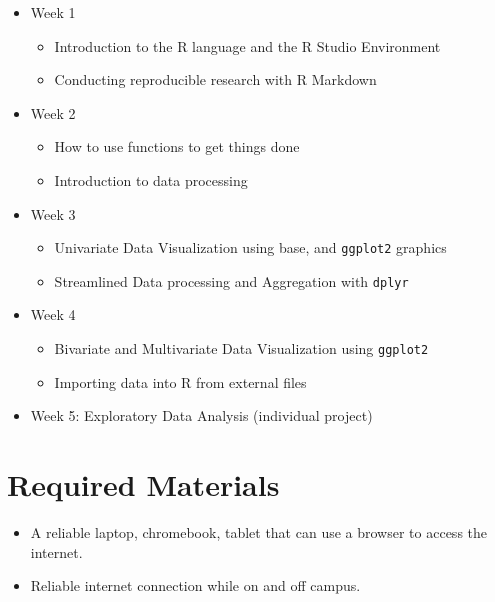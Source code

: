 \documentclass[
  11pt,
]{article}
\providecommand{\tightlist}{%
  \setlength{\itemsep}{0pt}\setlength{\parskip}{0pt}}
\begin{document}
\begin{itemize}
\tightlist
\item
  Week 1

  \begin{itemize}
  \tightlist
  \item
    Introduction to the R language and the R Studio Environment
  \item
    Conducting reproducible research with R Markdown
  \end{itemize}
\item
  Week 2

  \begin{itemize}
  \tightlist
  \item
    How to use functions to get things done
  \item
    Introduction to data processing
  \end{itemize}
\item
  Week 3

  \begin{itemize}
  \tightlist
  \item
    Univariate Data Visualization using base, and \texttt{ggplot2}
    graphics
  \item
    Streamlined Data processing and Aggregation with \texttt{dplyr}
  \end{itemize}
\item
  Week 4

  \begin{itemize}
  \tightlist
  \item
    Bivariate and Multivariate Data Visualization using \texttt{ggplot2}
  \item
    Importing data into R from external files
  \end{itemize}
\item
  Week 5: Exploratory Data Analysis (individual project)
\end{itemize}

\section{Required Materials}\label{required-materials}

\begin{itemize}
\tightlist
\item
  A reliable laptop, chromebook, tablet that can use a browser to access
  the internet.
\item
  Reliable internet connection while on and off campus.
\end{itemize}
\end{document}
